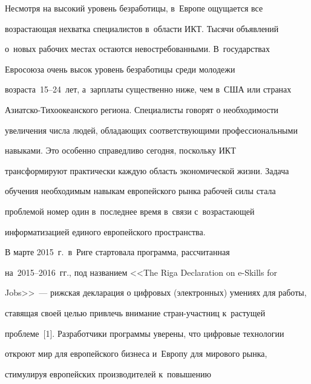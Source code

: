 







      \thispagestyle{headings}


      








  Несмотря на высокий уровень безработицы, в~Европе ощущается все 


воз\-рас\-та\-ющая нехватка специалистов в~области ИКТ. Тысячи объявлений 


о~новых рабочих местах остаются невостребованными. В~государствах 


Евросоюза очень высок уровень безработицы среди молодежи  


возраста~15--24~лет, а~зарплаты существенно ниже, чем в~США или странах 


Азиатско-Тихоокеанского региона. Специалисты говорят о необходимости 


увеличения числа людей, обладающих соответствующими профессиональными 


навыками. Это особенно справедливо сегодня, поскольку ИКТ 


трансформируют практически каждую область экономической жизни. Задача 


обучения необходимым навыкам европейского рынка рабочей силы стала 


проблемой номер один в~последнее время в~связи с~возрастающей 


информатизацией единого европейского пространства. 


  


  В марте 2015~г.\ в~Риге стартовала программа, рассчитанная  


на~2015--2016~гг., под названием <<The Riga Declaration on e-Skills for 


Jobs>>~--- рижская декларация о цифровых (электронных) умениях для работы, 


ставящая своей целью привлечь внимание стран-участниц к~растущей 


проблеме~[1]. Разработчики программы уверены, что цифровые технологии 


откроют мир для европейского бизнеса и~Европу для мирового рынка, 


стимулируя европейских производителей к~повышению 


